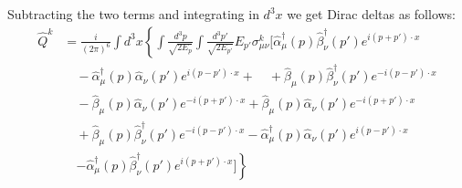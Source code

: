 Subtracting the two terms  and integrating in $d^3 x$ we get Dirac deltas as follows:
\begin{equation}
\begin{split}
    \hat Q^k &= \frac{i}{(2\pi)^6}  \int d^3 x \left\{  \int \frac{d^3 p}{\sqrt{2E_p}} \int \frac{d^3 p'}{\sqrt{2E_{p'}}} E_{p'}  \sigma^k_{\mu\nu} \bigg[  \hat{\alpha}_\mu^\dagger (p) \hat{\beta}_\nu^\dagger (p') e^{i(p+p')\cdot x} \right. \\
    &\quad -  \hat{\alpha}_\mu^\dagger (p) \hat{\alpha}_\nu (p') e^{i(p-p')\cdot x} + \quad +  \hat{\beta}_\mu (p) \hat{\beta}_\nu^\dagger (p') e^{-i(p-p')\cdot x} \\
    &\quad -  \hat{\beta}_\mu (p) \hat{\alpha}_\nu (p') e^{-i(p+p')\cdot x} + \hat{\beta}_\mu (p) \hat{\alpha}_\nu (p') e^{-i(p+p')\cdot x} \\
    &\quad + \hat{\beta}_\mu (p) \hat{\beta}_\nu^\dagger (p') e^{-i(p-p')\cdot x}  - \hat{\alpha}_\mu^\dagger (p) \hat{\alpha}_\nu (p') e^{i(p-p')\cdot x} \\
    &\quad \left. - \hat{\alpha}_\mu^\dagger (p) \hat{\beta}_\nu^\dagger (p') e^{i(p+p')\cdot x} \bigg]\right\}
\end{split}
\end{equation}